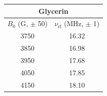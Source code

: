 \begin{tabular}{cc}
\hline
\multicolumn{2}{c}{Glycerin} \\
\hline
$B_0$ (G, $\pm$ 50) & $\nu_{\mathrm{rf}}$ (MHz, $\pm$ 1) \\
\hline
3750 & 16.32 \\
3850 & 16.98 \\
3950 & 17.68 \\
4050 & 17.85 \\
4150 & 18.10 \\
\hline
\end{tabular}
